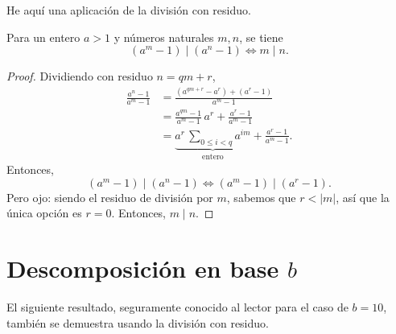 He aquí una aplicación de la división con residuo.

\begin{proposicion}
  Para un entero $a > 1$ y números naturales $m, n$, se tiene
  $$(a^m - 1) \mid (a^n-1) \iff m \mid n.$$

  \begin{proof}
    Dividiendo con residuo
    $n = qm + r$,
    \begin{align*}
      \frac{a^n-1}{a^m-1} & = \frac{(a^{qm + r} - a^r) + (a^r - 1)}{a^m - 1} \\
                          & = \frac{a^{qm} - 1}{a^m - 1}\,a^r + \frac{a^r - 1}{a^m - 1} \\
                          & = \underbrace{a^r \, \sum_{0 \le i < q} a^{im}}_{\text{entero}} + \frac{a^r - 1}{a^m - 1}.
    \end{align*}
    Entonces,
    $$(a^m - 1) \mid (a^n-1) \iff (a^m - 1) \mid (a^r - 1).$$
    Pero ojo: siendo el residuo de división por $m$, sabemos que $r < |m|$, así
    que la única opción es $r = 0$. Entonces, $m \mid n$.
  \end{proof}
\end{proposicion}


\section{Descomposición en base $b$}

El siguiente resultado, seguramente conocido al lector para el caso de $b = 10$,
también se demuestra usando la división con residuo.


